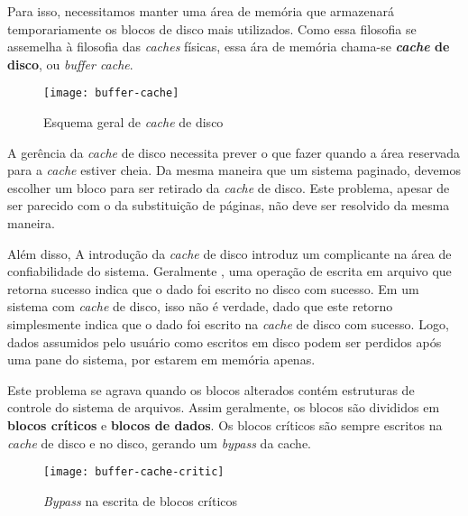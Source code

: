 Para isso, necessitamos manter uma área de memória que armazenará temporariamente os blocos de disco mais utilizados. Como essa filosofia se assemelha à filosofia das \textit{caches} físicas, essa ára de memória chama-se \textbf{\textit{cache} de disco}, ou \textit{buffer cache}.

\begin{figure}[h]
  \centering
  \texttt{[image: buffer-cache]}
  \caption{Esquema geral de \textit{cache} de disco}
  \label{fig:buffer-cache}
\end{figure}

A gerência da \textit{cache} de disco necessita prever o que fazer quando a área reservada para a \textit{cache} estiver cheia. Da mesma maneira que um sistema paginado, devemos escolher um bloco para ser retirado da \textit{cache} de disco. Este problema, apesar de ser parecido com o da substituição de páginas, não deve ser resolvido da mesma maneira.

Além disso, A introdução da \textit{cache} de disco introduz um complicante na área de confiabilidade do sistema. Geralmente , uma operação de escrita em arquivo que retorna sucesso indica que o dado foi escrito no disco com sucesso. Em um sistema com \textit{cache} de disco, isso não é verdade, dado que este retorno simplesmente indica que o dado foi escrito na \textit{cache} de disco com sucesso. Logo, dados assumidos pelo usuário como escritos em disco podem ser perdidos após uma pane do sistema, por estarem em memória apenas.

Este problema se agrava quando os blocos alterados contém estruturas de controle do sistema de arquivos. Assim geralmente, os blocos são divididos em \textbf{blocos críticos} e \textbf{blocos de dados}. Os blocos críticos são sempre escritos na \textit{cache} de disco e no disco, gerando um \textit{bypass} da cache.

\begin{figure}[h]
  \centering
  \texttt{[image: buffer-cache-critic]}
  \caption{\textit{Bypass} na escrita de blocos críticos}
  \label{fig:buffer-cache-critic}
\end{figure}
